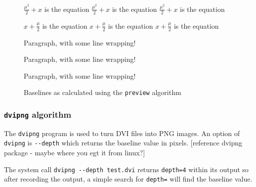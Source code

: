 \documentclass[]{article}
\begin{document}
\begin{figure}
\begin{center}
\vspace{0.3cm}
\settodepth{\dvidepth} {$\frac{\mu^2}{2} + x$ is the equation}%
\settowidth{\dviwidth} {$\frac{\mu^2}{2} + x$ is the equation}%
\raisebox{\dimexpr -\dvidepth+3.44841pt}{\makebox[0in][l]{\rule{\dviwidth}{.1pt}}}%
$\frac{\mu^2}{2} + x$ is the equation

\vspace{0.3cm}
\settodepth{\dvidepth} {$x + \frac{\mu}{2}$ is the equation}%
\settowidth{\dviwidth} {$x + \frac{\mu}{2}$ is the equation}%
\raisebox{\dimexpr -\dvidepth+3.44841pt}{\makebox[0in][l]{\rule{\dviwidth}{.1pt}}}%
$x + \frac{\mu}{2}$ is the equation

\vspace{0.3cm}
\settodepth{\dvidepth} {\begin{minipage}{1in}Paragraph, with some line wrapping!\end{minipage}}%
\settowidth{\dviwidth} {\begin{minipage}{1in}Paragraph, with some line wrapping!\end{minipage}}%
\raisebox{\dimexpr -\dvidepth+13.94444pt}{\makebox[0in][l]{\rule{\dviwidth}{.1pt}}}%
\begin{minipage}{1in}Paragraph, with some line wrapping!\end{minipage}

\vspace{0.3cm}
\end{center}
\caption{Baselines as calculated using the \texttt{preview} algorithm}
\end{figure}

\subsubsection{\texorpdfstring{\texttt{dvipng}
algorithm}{dvipng algorithm}}\label{dvipng-algorithm}

The \texttt{dvipng} program is used to turn DVI files into PNG images.
An option of \texttt{dvipng} is \texttt{-\/-depth} which returns the
baseline value in pixels. {[}reference dvipng package - maybe where you
egt it from linux?{]}

The system call \texttt{dvipng\ -\/-depth\ test.dvi} returns
\texttt{depth=4} within its output so after recording the output, a
simple search for \texttt{depth=} will find the baseline value.
\end{document}
